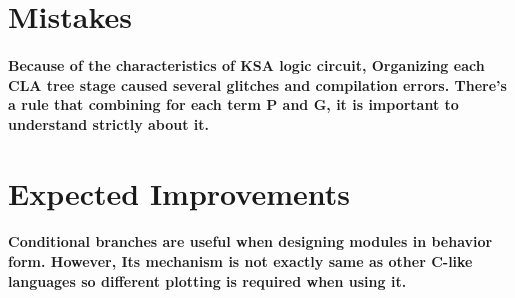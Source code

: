 \documentclass[a4paper]{report}
\begin{document}
        \section{Mistakes}
            \paragraph{\normalfont Because of the characteristics of KSA logic circuit, Organizing each CLA tree stage caused several glitches and compilation errors. There's a rule that combining for each term P and G, it is important to understand strictly about it. }

        \section{Expected Improvements}
            \paragraph{\normalfont Conditional branches are useful when designing modules in behavior form. However, Its mechanism is not exactly same as other C-like languages so different plotting is required when using it.}
\end{document}

